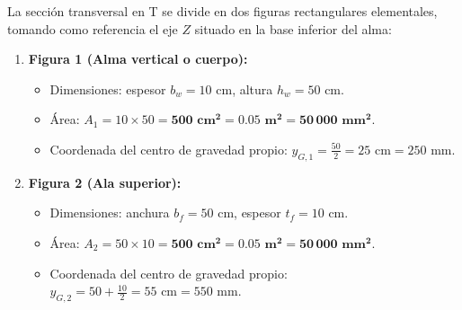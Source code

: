 {    

    La sección transversal en T se divide en dos figuras rectangulares elementales, tomando como referencia el eje $Z$ situado en la base inferior del alma:
    \begin{enumerate}
        \item \textbf{Figura 1 (Alma vertical o cuerpo):}
              \begin{itemize}
                  \item Dimensiones: espesor $b_w = 10\text{ cm}$, altura $h_w = 50\text{ cm}$.
                  \item Área: $A_1 = 10 \times 50 = \mathbf{500\text{ cm}^2 = 0.05\text{ m}^2 = 50\,000\text{ mm}^2}$.
                  \item Coordenada del centro de gravedad propio: $y_{G,1} = \frac{50}{2} = 25\text{ cm} = 250\text{ mm}$.
              \end{itemize}
        \item \textbf{Figura 2 (Ala superior):}
              \begin{itemize}
                  \item Dimensiones: anchura $b_f = 50\text{ cm}$, espesor $t_f = 10\text{ cm}$.
                  \item Área: $A_2 = 50 \times 10 = \mathbf{500\text{ cm}^2 = 0.05\text{ m}^2 = 50\,000\text{ mm}^2}$.
                  \item Coordenada del centro de gravedad propio: $y_{G,2} = 50 + \frac{10}{2} = 55\text{ cm} = 550\text{ mm}$.
              \end{itemize}
    \end{enumerate}

    \begin{center}
\end{center}}
